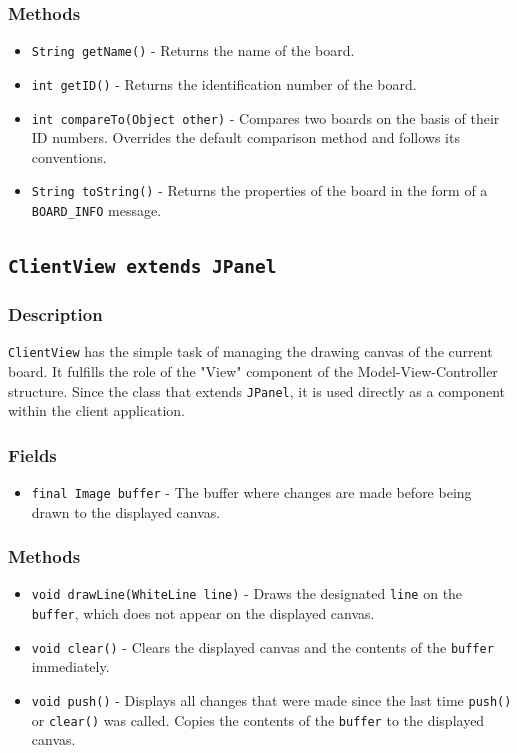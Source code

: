 \subsubsection{Methods}
\begin{itemize}
\item \texttt{String getName()} - Returns the name of the board.
\item \texttt{int getID()} - Returns the identification number of the board.
\item \texttt{int compareTo(Object other)} - Compares two boards on the basis of their ID numbers. Overrides the default comparison method and follows its conventions.
\item \texttt{String toString()} - Returns the properties of the board in the form of a \texttt{BOARD\_INFO} message.
\end{itemize}


\subsection{\texttt{ClientView extends JPanel}}

\subsubsection{Description}
\texttt{ClientView} has the simple task of managing the drawing canvas of the current board. It fulfills the role of the "View" component of the Model-View-Controller structure. Since the class that extends \texttt{JPanel}, it is used directly as a component within the client application.

\subsubsection{Fields}
\begin{itemize}
\item \texttt{final Image buffer} - The buffer where changes are made before being drawn to the displayed canvas.
\end{itemize}

\subsubsection{Methods}
\begin{itemize}
\item \texttt{void drawLine(WhiteLine line)} - Draws the designated \texttt{line} on the \texttt{buffer}, which does not appear on the displayed canvas.
\item \texttt{void clear()} - Clears the displayed canvas and the contents of the \texttt{buffer} immediately.
\item \texttt{void push()} - Displays all changes that were made since the last time \texttt{push()} or \texttt{clear()} was called. Copies the contents of the \texttt{buffer} to the displayed canvas.
\end{itemize}